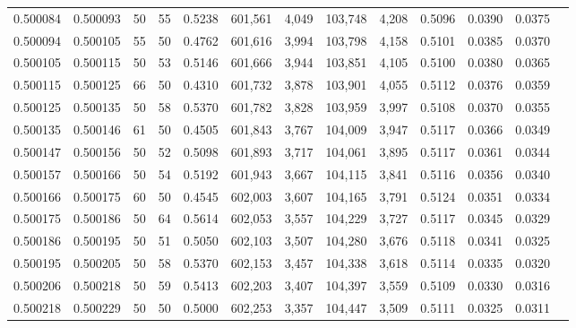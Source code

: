 \begin{tabular}{rrrrrrrrrrrrr}
0.500084 & 0.500093 &    50 &  55 &                                     0.5238 & 601,561 &   4,049 & 103,748 &   4,208 & 0.5096 & 0.0390 & 0.0375 \\
0.500094 & 0.500105 &    55 &  50 &                                     0.4762 & 601,616 &   3,994 & 103,798 &   4,158 & 0.5101 & 0.0385 & 0.0370 \\
0.500105 & 0.500115 &    50 &  53 &                                     0.5146 & 601,666 &   3,944 & 103,851 &   4,105 & 0.5100 & 0.0380 & 0.0365 \\
0.500115 & 0.500125 &    66 &  50 &                                     0.4310 & 601,732 &   3,878 & 103,901 &   4,055 & 0.5112 & 0.0376 & 0.0359 \\
0.500125 & 0.500135 &    50 &  58 &                                     0.5370 & 601,782 &   3,828 & 103,959 &   3,997 & 0.5108 & 0.0370 & 0.0355 \\
0.500135 & 0.500146 &    61 &  50 &                                     0.4505 & 601,843 &   3,767 & 104,009 &   3,947 & 0.5117 & 0.0366 & 0.0349 \\
0.500147 & 0.500156 &    50 &  52 &                                     0.5098 & 601,893 &   3,717 & 104,061 &   3,895 & 0.5117 & 0.0361 & 0.0344 \\
0.500157 & 0.500166 &    50 &  54 &                                     0.5192 & 601,943 &   3,667 & 104,115 &   3,841 & 0.5116 & 0.0356 & 0.0340 \\
0.500166 & 0.500175 &    60 &  50 &                                     0.4545 & 602,003 &   3,607 & 104,165 &   3,791 & 0.5124 & 0.0351 & 0.0334 \\
0.500175 & 0.500186 &    50 &  64 &                                     0.5614 & 602,053 &   3,557 & 104,229 &   3,727 & 0.5117 & 0.0345 & 0.0329 \\
0.500186 & 0.500195 &    50 &  51 &                                     0.5050 & 602,103 &   3,507 & 104,280 &   3,676 & 0.5118 & 0.0341 & 0.0325 \\
0.500195 & 0.500205 &    50 &  58 &                                     0.5370 & 602,153 &   3,457 & 104,338 &   3,618 & 0.5114 & 0.0335 & 0.0320 \\
0.500206 & 0.500218 &    50 &  59 &                                     0.5413 & 602,203 &   3,407 & 104,397 &   3,559 & 0.5109 & 0.0330 & 0.0316 \\
0.500218 & 0.500229 &    50 &  50 &                                     0.5000 & 602,253 &   3,357 & 104,447 &   3,509 & 0.5111 & 0.0325 & 0.0311 \\

\end{tabular}

